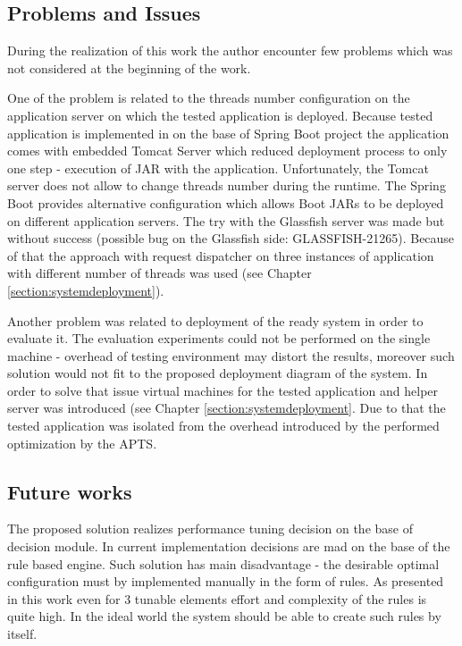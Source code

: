 \documentclass[12pt,a4paper]{article}
\begin{document}
\subsection{Problems and Issues}

During the realization of this work the author encounter few problems which was not considered at the beginning of the work.

One of the problem is related to the threads number configuration on the application server on which the tested application is deployed. Because tested application is implemented in on the base of Spring Boot project the application comes with embedded Tomcat Server which reduced deployment process to only one step - execution of JAR with the application. Unfortunately, the Tomcat server does not allow to change threads number during the runtime. The Spring Boot provides alternative configuration which allows Boot JARs to be deployed on different application servers. The try with the Glassfish server was made but without success (possible bug on the Glassfish side: GLASSFISH-21265).  Because of that the approach with request dispatcher on three instances of application with different number of threads was used (see Chapter \ref{section:systemdeployment}). 

Another problem was related to deployment of the ready system in order to evaluate it. The evaluation experiments could not be performed on the single machine - overhead of testing environment may distort the results, moreover such solution would not fit to the proposed deployment diagram of the system. In order to solve that issue virtual machines for the tested application and helper server was introduced (see Chapter \ref{section:systemdeployment}. Due to that the tested application was isolated from the overhead introduced by the performed optimization by the APTS. 

\subsection{Future works}

The proposed solution realizes performance tuning decision on the base of decision module. In current implementation decisions are mad on the base of the rule based engine. Such solution has main disadvantage - the desirable optimal configuration must by implemented manually in the form of rules. As presented in this work even for 3 tunable elements effort and complexity of the rules is quite high. In the ideal world the system should be able to create such rules by itself. 
\end{document}

